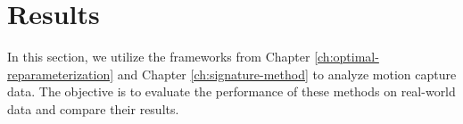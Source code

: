 \section{Results}
\label{sec:motion-capture-data-results}

In this section, we utilize the frameworks from Chapter \ref{ch:optimal-reparameterization} and Chapter \ref{ch:signature-method} to analyze motion capture data. The objective is to evaluate the performance of these methods on real-world data and compare their results.



